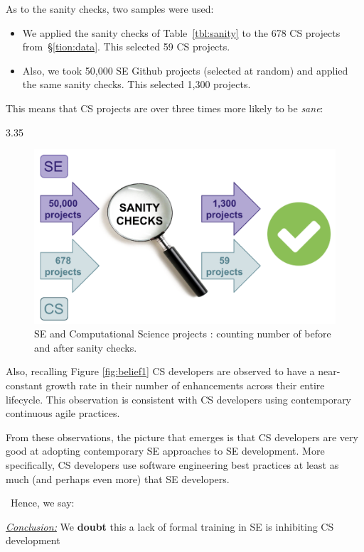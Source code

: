 \documentclass[sigconf,review,anonymous]{acmart}
\newcommand{\bi}{\begin{itemize}}
\newcommand{\ei}{\end{itemize}}
\newenvironment{RQ}{\vspace{1mm}\begin{tcolorbox}[enhanced,width=3.4in,size=fbox,colback=red!5!white,drop shadow southeast,sharp corners]}{\end{tcolorbox}}
\begin{document}
As to the sanity checks, 
two samples were used:
\bi
\item
We applied the sanity checks
of Table~\ref{tbl:sanity} to the 678 CS projects from~\S\ref{tion:data}. This selected 59 CS projects.
\item
Also, we took 50,000 SE Github projects (selected at random) and applied
the same sanity checks. This selected 1,300 projects.
\ei
This means that CS projects are over three times more likely to be {\em sane}: 

\centerline{  3.35 }

\begin{figure}
  \centering
  \includegraphics[width=\linewidth]{img/sanity.png} 
  \caption{ SE and Computational Science  projects : counting number of before and after sanity checks.}
  \label{fig:sanity}
\end{figure}
 Also, recalling Figure \ref{fig:belief1} CS developers are observed to have a near-constant growth rate in their number of enhancements across their entire lifecycle. This observation is consistent with CS developers using
  contemporary continuous agile practices. 

From these observations, the picture that emerges is that CS developers are very good at adopting contemporary  SE approaches to SE development. More specifically, CS developers
use software engineering best practices   at least as much (and perhaps even more) that SE developers. 

\
Hence, we say: 
\begin{RQ}
\textit{\underline{Conclusion:}} We \textbf{doubt} this a lack of formal training in SE is inhibiting CS development
\end{RQ}
\end{document}
